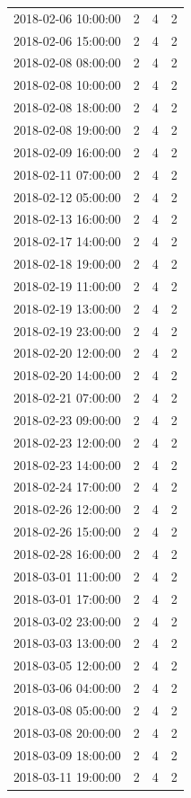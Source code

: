 \begin{tabular}{lrrr}
2018-02-06 10:00:00 & 2 & 4 & 2 \\
2018-02-06 15:00:00 & 2 & 4 & 2 \\
2018-02-08 08:00:00 & 2 & 4 & 2 \\
2018-02-08 10:00:00 & 2 & 4 & 2 \\
2018-02-08 18:00:00 & 2 & 4 & 2 \\
2018-02-08 19:00:00 & 2 & 4 & 2 \\
2018-02-09 16:00:00 & 2 & 4 & 2 \\
2018-02-11 07:00:00 & 2 & 4 & 2 \\
2018-02-12 05:00:00 & 2 & 4 & 2 \\
2018-02-13 16:00:00 & 2 & 4 & 2 \\
2018-02-17 14:00:00 & 2 & 4 & 2 \\
2018-02-18 19:00:00 & 2 & 4 & 2 \\
2018-02-19 11:00:00 & 2 & 4 & 2 \\
2018-02-19 13:00:00 & 2 & 4 & 2 \\
2018-02-19 23:00:00 & 2 & 4 & 2 \\
2018-02-20 12:00:00 & 2 & 4 & 2 \\
2018-02-20 14:00:00 & 2 & 4 & 2 \\
2018-02-21 07:00:00 & 2 & 4 & 2 \\
2018-02-23 09:00:00 & 2 & 4 & 2 \\
2018-02-23 12:00:00 & 2 & 4 & 2 \\
2018-02-23 14:00:00 & 2 & 4 & 2 \\
2018-02-24 17:00:00 & 2 & 4 & 2 \\
2018-02-26 12:00:00 & 2 & 4 & 2 \\
2018-02-26 15:00:00 & 2 & 4 & 2 \\
2018-02-28 16:00:00 & 2 & 4 & 2 \\
2018-03-01 11:00:00 & 2 & 4 & 2 \\
2018-03-01 17:00:00 & 2 & 4 & 2 \\
2018-03-02 23:00:00 & 2 & 4 & 2 \\
2018-03-03 13:00:00 & 2 & 4 & 2 \\
2018-03-05 12:00:00 & 2 & 4 & 2 \\
2018-03-06 04:00:00 & 2 & 4 & 2 \\
2018-03-08 05:00:00 & 2 & 4 & 2 \\
2018-03-08 20:00:00 & 2 & 4 & 2 \\
2018-03-09 18:00:00 & 2 & 4 & 2 \\
2018-03-11 19:00:00 & 2 & 4 & 2 \\

\end{tabular}
